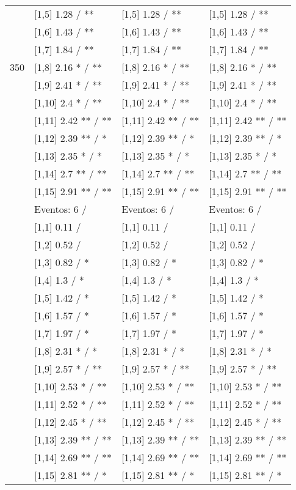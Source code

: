 \begin{table}
\begin{tabular}[t]{llll}
 & {}[1,5] 1.28  / ** & {}[1,5] 1.28  / ** & {}[1,5] 1.28  / **\\
 & {}[1,6] 1.43  / ** & {}[1,6] 1.43  / ** & {}[1,6] 1.43  / **\\
 & {}[1,7] 1.84  / ** & {}[1,7] 1.84  / ** & {}[1,7] 1.84  / **\\
350 & {}[1,8] 2.16 * / ** & {}[1,8] 2.16 * / ** & {}[1,8] 2.16 * / **\\
\addlinespace
 & {}[1,9] 2.41 * / ** & {}[1,9] 2.41 * / ** & {}[1,9] 2.41 * / **\\
 & {}[1,10] 2.4 * / ** & {}[1,10] 2.4 * / ** & {}[1,10] 2.4 * / **\\
 & {}[1,11] 2.42 ** / ** & {}[1,11] 2.42 ** / ** & {}[1,11] 2.42 ** / **\\
 & {}[1,12] 2.39 ** / * & {}[1,12] 2.39 ** / * & {}[1,12] 2.39 ** / *\\
 & {}[1,13] 2.35 * / * & {}[1,13] 2.35 * / * & {}[1,13] 2.35 * / *\\
\addlinespace
 & {}[1,14] 2.7 ** / ** & {}[1,14] 2.7 ** / ** & {}[1,14] 2.7 ** / **\\
 & {}[1,15] 2.91 ** / ** & {}[1,15] 2.91 ** / ** & {}[1,15] 2.91 ** / **\\
 & Eventos:  6 / & Eventos:  6 / & Eventos:  6 /\\
 & {}[1,1] 0.11  / & {}[1,1] 0.11  / & {}[1,1] 0.11  /\\
 & {}[1,2] 0.52  / & {}[1,2] 0.52  / & {}[1,2] 0.52  /\\
\addlinespace
 & {}[1,3] 0.82  / * & {}[1,3] 0.82  / * & {}[1,3] 0.82  / *\\
 & {}[1,4] 1.3  / * & {}[1,4] 1.3  / * & {}[1,4] 1.3  / *\\
 & {}[1,5] 1.42  / * & {}[1,5] 1.42  / * & {}[1,5] 1.42  / *\\
 & {}[1,6] 1.57  / * & {}[1,6] 1.57  / * & {}[1,6] 1.57  / *\\
 & {}[1,7] 1.97  / * & {}[1,7] 1.97  / * & {}[1,7] 1.97  / *\\
\addlinespace
500 & {}[1,8] 2.31 * / * & {}[1,8] 2.31 * / * & {}[1,8] 2.31 * / *\\
 & {}[1,9] 2.57 * / ** & {}[1,9] 2.57 * / ** & {}[1,9] 2.57 * / **\\
 & {}[1,10] 2.53 * / ** & {}[1,10] 2.53 * / ** & {}[1,10] 2.53 * / **\\
 & {}[1,11] 2.52 * / ** & {}[1,11] 2.52 * / ** & {}[1,11] 2.52 * / **\\
 & {}[1,12] 2.45 * / ** & {}[1,12] 2.45 * / ** & {}[1,12] 2.45 * / **\\
\addlinespace
 & {}[1,13] 2.39 ** / ** & {}[1,13] 2.39 ** / ** & {}[1,13] 2.39 ** / **\\
 & {}[1,14] 2.69 ** / ** & {}[1,14] 2.69 ** / ** & {}[1,14] 2.69 ** / **\\
 & {}[1,15] 2.81 ** / * & {}[1,15] 2.81 ** / * & {}[1,15] 2.81 ** / *\\
\bottomrule
\end{tabular}
\end{table}
